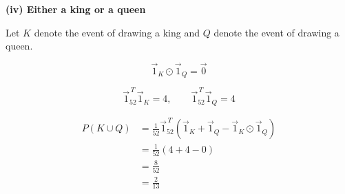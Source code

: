 \begin{enumerate}[label=\thesubsection.\arabic*, ref=\thesubsection.\theenumi]
\par
\medskip
\noindent\textbf{(iv) Either a king or a queen}
\par
\smallskip

Let $K$ denote the event of drawing a king and
$Q$ denote the event of drawing a queen.

\[
\vec{1}_K\odot\vec{1}_Q=\vec{0}
\]

\[
\vec{1}_{52}^{\,T}\vec{1}_K=4,
\qquad
\vec{1}_{52}^{\,T}\vec{1}_Q=4
\]

\[
\begin{aligned}
P(K\cup Q)
&=\frac{1}{52}\vec{1}_{52}^{\,T}
\left(
\vec{1}_K+\vec{1}_Q-
\vec{1}_K\odot\vec{1}_Q
\right)\\[6pt]
&=\frac{1}{52}(4+4-0)\\
&=\frac{8}{52}\\
&=\frac{2}{13}
\end{aligned}
\]

\end{enumerate}
